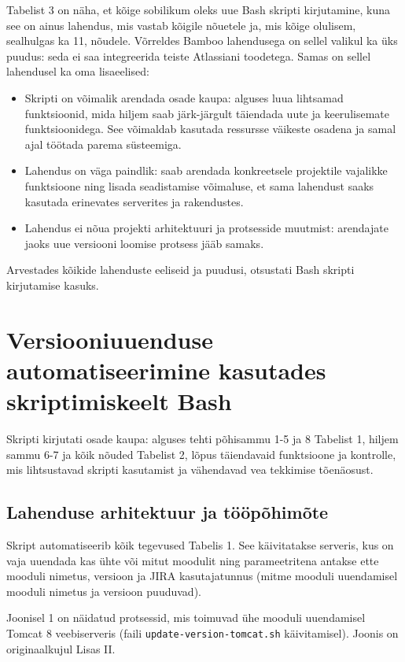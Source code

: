 \documentclass[12pt]{article}
\newcommand{\code}[1]{\texttt{#1}}
\begin{document}
  Tabelist 3 on näha, et kõige sobilikum oleks uue Bash skripti kirjutamine, kuna see on ainus lahendus, mis vastab kõigile nõuetele ja, mis kõige olulisem, sealhulgas ka 11, nõudele. Võrreldes Bamboo lahendusega on sellel valikul ka üks puudus: seda ei saa integreerida teiste Atlassiani toodetega. Samas on sellel lahendusel ka oma lisaeelised:
  \begin{itemize}
    \item Skripti on võimalik arendada osade kaupa: alguses luua lihtsamad funktsioonid, mida hiljem saab järk-järgult täiendada uute ja keerulisemate funktsioonidega. See võimaldab kasutada ressursse väikeste osadena ja samal ajal töötada parema süsteemiga.
    \item Lahendus on väga paindlik: saab arendada konkreetsele projektile vajalikke funktsioone ning lisada seadistamise võimaluse, et sama lahendust saaks kasutada erinevates serverites ja rakendustes.
    \item Lahendus ei nõua projekti arhitektuuri ja protsesside muutmist: arendajate jaoks uue versiooni loomise protsess jääb samaks.
  \end{itemize}
  
  Arvestades kõikide lahenduste eeliseid ja puudusi, otsustati Bash skripti kirjutamise kasuks.
  
  \newpage
  
  \section{Versiooniuuenduse automatiseerimine kasutades skriptimiskeelt Bash}
  
  Skripti kirjutati osade kaupa: alguses tehti põhisammu 1-5 ja 8 Tabelist 1, hiljem sammu 6-7 ja kõik nõuded Tabelist 2, lõpus täiendavaid funktsioone ja kontrolle, mis lihtsustavad skripti kasutamist ja vähendavad vea tekkimise tõenäosust.
  
  \subsection{Lahenduse arhitektuur ja tööpõhimõte}
  
  Skript automatiseerib kõik tegevused Tabelis 1. See käivitatakse serveris, kus on vaja uuendada kas ühte või mitut moodulit ning parameetritena antakse ette mooduli nimetus, versioon ja JIRA kasutajatunnus (mitme mooduli uuendamisel mooduli nimetus ja versioon puuduvad).
  
  Joonisel 1 on näidatud protsessid, mis toimuvad ühe mooduli uuendamisel Tomcat 8 veebiserveris (faili \code{update-version-tomcat.sh} käivitamisel). Joonis on originaalkujul Lisas II.
   
\end{document}
